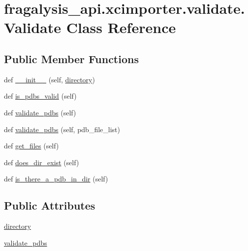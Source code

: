 \hypertarget{classfragalysis__api_1_1xcimporter_1_1validate_1_1_validate}{}\section{fragalysis\+\_\+api.\+xcimporter.\+validate.\+Validate Class Reference}
\label{classfragalysis__api_1_1xcimporter_1_1validate_1_1_validate}
\subsection*{Public Member Functions}
\begin{DoxyCompactItemize}
\item 
def \hyperlink{classfragalysis__api_1_1xcimporter_1_1validate_1_1_validate_a27319a45d204d3a917eb000a0e636e3e}{\+\_\+\+\_\+init\+\_\+\+\_\+} (self, \hyperlink{classfragalysis__api_1_1xcimporter_1_1validate_1_1_validate_a4ef4b2db6e032059c04e6dead4a8998f}{directory})
\item 
def \hyperlink{classfragalysis__api_1_1xcimporter_1_1validate_1_1_validate_a174b180dade39cdd984389ab32ed3732}{is\+\_\+pdbs\+\_\+valid} (self)
\item 
def \hyperlink{classfragalysis__api_1_1xcimporter_1_1validate_1_1_validate_a1e2236300274a3e4c91944ff8a10f432}{validate\+\_\+pdbs} (self)
\item 
def \hyperlink{classfragalysis__api_1_1xcimporter_1_1validate_1_1_validate_a2efb516ce319ed46c758ffbf70056df1}{validate\+\_\+pdbs} (self, pdb\+\_\+file\+\_\+list)
\item 
def \hyperlink{classfragalysis__api_1_1xcimporter_1_1validate_1_1_validate_a0b6c43c8e26bc7b2bc5f2caf982f0a5e}{get\+\_\+files} (self)
\item 
def \hyperlink{classfragalysis__api_1_1xcimporter_1_1validate_1_1_validate_a885f473957a347300395920895108c64}{does\+\_\+dir\+\_\+exist} (self)
\item 
def \hyperlink{classfragalysis__api_1_1xcimporter_1_1validate_1_1_validate_a7203bedad575f779345a78f7880a58a2}{is\+\_\+there\+\_\+a\+\_\+pdb\+\_\+in\+\_\+dir} (self)
\end{DoxyCompactItemize}
\subsection*{Public Attributes}
\begin{DoxyCompactItemize}
\item 
\hyperlink{classfragalysis__api_1_1xcimporter_1_1validate_1_1_validate_a4ef4b2db6e032059c04e6dead4a8998f}{directory}
\item 
\hyperlink{classfragalysis__api_1_1xcimporter_1_1validate_1_1_validate_a73358370d6a752874ee4641f4709eb67}{validate\+\_\+pdbs}
\end{DoxyCompactItemize}



